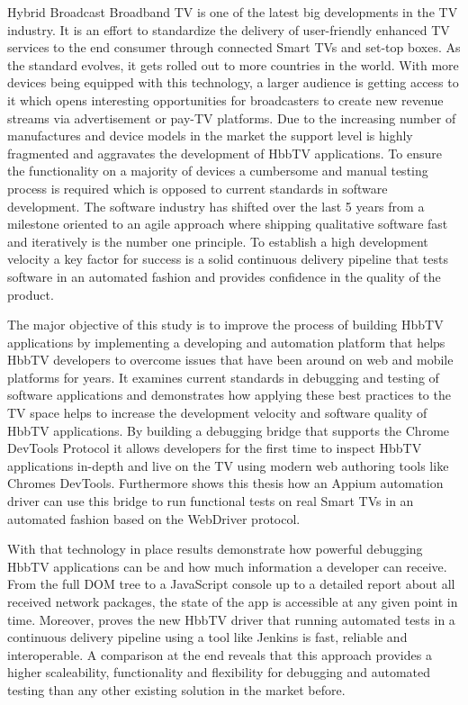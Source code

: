 Hybrid Broadcast Broadband TV is one of the latest big developments in the TV industry. It is an effort to standardize the delivery of user-friendly enhanced TV services to the end consumer through connected Smart TVs and set-top boxes. As the standard evolves, it gets rolled out to more countries in the world. With more devices being equipped with this technology, a larger audience is getting access to it which opens interesting opportunities for broadcasters to create new revenue streams via advertisement or pay-TV platforms. Due to the increasing number of manufactures and device models in the market the support level is highly fragmented and aggravates the development of HbbTV applications. To ensure the functionality on a majority of devices a cumbersome and manual testing process is required which is opposed to current standards in software development. The software industry has shifted over the last 5 years from a milestone oriented to an agile approach where shipping qualitative software fast and iteratively is the number one principle. To establish a high development velocity a key factor for success is a solid continuous delivery pipeline that tests software in an automated fashion and provides confidence in the quality of the product.

The major objective of this study is to improve the process of building HbbTV applications by implementing a developing and automation platform that helps HbbTV developers to overcome issues that have been around on web and mobile platforms for years. It examines current standards in debugging and testing of software applications and demonstrates how applying these best practices to the TV space helps to increase the development velocity and software quality of HbbTV applications. By building a debugging bridge that supports the Chrome DevTools Protocol it allows developers for the first time to inspect HbbTV applications in-depth and live on the TV using modern web authoring tools like Chromes DevTools. Furthermore shows this thesis how an Appium automation driver can use this bridge to run functional tests on real Smart TVs in an automated fashion based on the WebDriver protocol.

With that technology in place results demonstrate how powerful debugging HbbTV applications can be and how much information a developer can receive. From the full DOM tree to a JavaScript console up to a detailed report about all received network packages, the state of the app is accessible at any given point in time. Moreover, proves the new HbbTV driver that running automated tests in a continuous delivery pipeline using a tool like Jenkins is fast, reliable and interoperable. A comparison at the end reveals that this approach provides a higher scaleability, functionality and flexibility for debugging and automated testing than any other existing solution in the market before.
